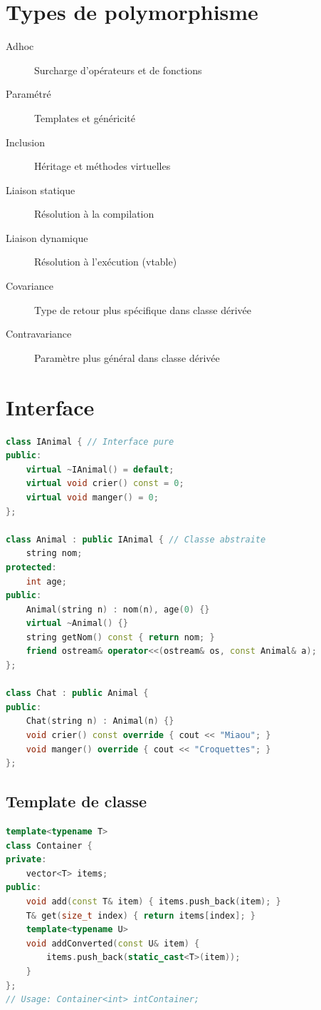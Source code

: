 \documentclass{article}
\begin{document}
\begin{multicols*}{3}
\section*{Types de polymorphisme}
\begin{description}
\item[Adhoc] Surcharge d'opérateurs et de fonctions
\item[Paramétré] Templates et généricité
\item[Inclusion] Héritage et méthodes virtuelles
\item[Liaison statique] Résolution à la compilation
\item[Liaison dynamique] Résolution à l'exécution (vtable)
\item[Covariance] Type de retour plus spécifique dans classe dérivée
\item[Contravariance] Paramètre plus général dans classe dérivée
\end{description}

\section*{Interface}
\begin{lstlisting}[language=C++]
class IAnimal { // Interface pure
public:
    virtual ~IAnimal() = default;
    virtual void crier() const = 0;
    virtual void manger() = 0;
};

class Animal : public IAnimal { // Classe abstraite
    string nom;
protected:
    int age;
public:
    Animal(string n) : nom(n), age(0) {}
    virtual ~Animal() {}
    string getNom() const { return nom; }
    friend ostream& operator<<(ostream& os, const Animal& a);
};

class Chat : public Animal {
public:
    Chat(string n) : Animal(n) {}
    void crier() const override { cout << "Miaou"; }
    void manger() override { cout << "Croquettes"; }
};
\end{lstlisting}

\subsection*{Template de classe}
\begin{lstlisting}[language=C++]
template<typename T>
class Container {
private:
    vector<T> items;
public:
    void add(const T& item) { items.push_back(item); }
    T& get(size_t index) { return items[index]; }
    template<typename U>
    void addConverted(const U& item) { 
        items.push_back(static_cast<T>(item)); 
    }
};
// Usage: Container<int> intContainer;
\end{lstlisting}


\end{multicols*}
\end{document}
